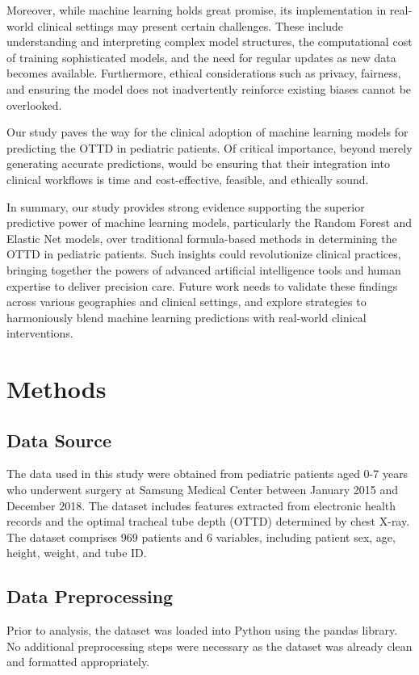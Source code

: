 \documentclass[11pt]{article}
\begin{document}
Moreover, while machine learning holds great promise, its implementation in real-world clinical settings may present certain challenges. These include understanding and interpreting complex model structures, the computational cost of training sophisticated models, and the need for regular updates as new data becomes available. Furthermore, ethical considerations such as privacy, fairness, and ensuring the model does not inadvertently reinforce existing biases cannot be overlooked. 

Our study paves the way for the clinical adoption of machine learning models for predicting the OTTD in pediatric patients. Of critical importance, beyond merely generating accurate predictions, would be ensuring that their integration into clinical workflows is time and cost-effective, feasible, and ethically sound.

In summary, our study provides strong evidence supporting the superior predictive power of machine learning models, particularly the Random Forest and Elastic Net models, over traditional formula-based methods in determining the OTTD in pediatric patients. Such insights could revolutionize clinical practices, bringing together the powers of advanced artificial intelligence tools and human expertise to deliver precision care. Future work needs to validate these findings across various geographies and clinical settings, and explore strategies to harmoniously blend machine learning predictions with real-world clinical interventions.

\section*{Methods}

\subsection*{Data Source}
The data used in this study were obtained from pediatric patients aged 0-7 years who underwent surgery at Samsung Medical Center between January 2015 and December 2018. The dataset includes features extracted from electronic health records and the optimal tracheal tube depth (OTTD) determined by chest X-ray. The dataset comprises 969 patients and 6 variables, including patient sex, age, height, weight, and tube ID.

\subsection*{Data Preprocessing}
Prior to analysis, the dataset was loaded into Python using the pandas library. No additional preprocessing steps were necessary as the dataset was already clean and formatted appropriately.
\end{document}
